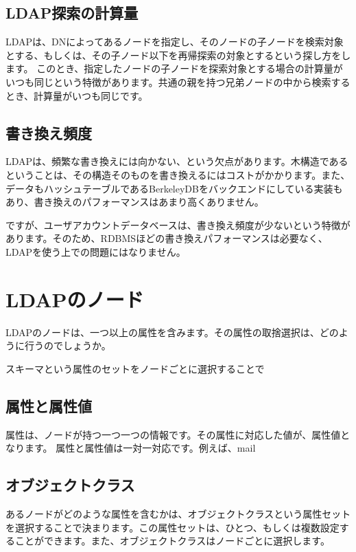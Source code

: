 \subsection{LDAP探索の計算量}

LDAPは、DNによってあるノードを指定し、そのノードの子ノードを検索対象とする、もしくは、その子ノード以下を再帰探索の対象とするという探し方をします。
このとき、指定したノードの子ノードを探索対象とする場合の計算量がいつも同じという特徴があります。共通の親を持つ兄弟ノードの中から検索するとき、計算量がいつも同じです。

\subsection{書き換え頻度}

LDAPは、頻繁な書き換えには向かない、という欠点があります。木構造であるということは、その構造そのものを書き換えるにはコストがかかります。また、データもハッシュテーブルであるBerkeleyDBをバックエンドにしている実装もあり、書き換えのパフォーマンスはあまり高くありません。

ですが、ユーザアカウントデータベースは、書き換え頻度が少ないという特徴があります。そのため、RDBMSほどの書き換えパフォーマンスは必要なく、LDAPを使う上での問題にはなりません。

\section{LDAPのノード}

LDAPのノードは、一つ以上の属性を含みます。その属性の取捨選択は、どのように行うのでしょうか。

スキーマという属性のセットをノードごとに選択することで

\subsection{属性と属性値}

属性は、ノードが持つ一つ一つの情報です。その属性に対応した値が、属性値となります。
属性と属性値は一対一対応です。例えば、mail



\subsection{オブジェクトクラス}

あるノードがどのような属性を含むかは、オブジェクトクラスという属性セットを選択することで決まります。この属性セットは、ひとつ、もしくは複数設定することができます。また、オブジェクトクラスはノードごとに選択します。

